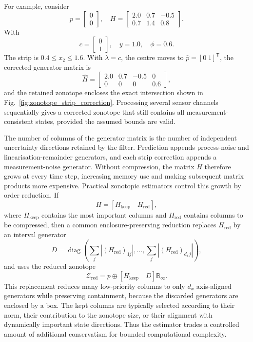 \documentclass{ieeeaccess}
\begin{document}
For example, consider
\begin{equation}
p=
\begin{bmatrix}
0\\
0
\end{bmatrix},
\quad
H=
\begin{bmatrix}
2.0 & 0.7 & -0.5\\
0.7 & 1.4 & 0.8
\end{bmatrix}.
\end{equation}
With
\begin{equation}
c=
\begin{bmatrix}
0\\
1
\end{bmatrix},
\quad
y=1.0,\quad
\phi=0.6.
\end{equation}
The strip is $0.4\le x_2\le1.6$. With $\lambda=c$, the centre moves to $\hat p=[0\;1]^{\mathsf T}$, the corrected generator matrix is
\begin{equation}
\hat H=
\begin{bmatrix}
2.0 & 0.7 & -0.5 & 0\\
0 & 0 & 0 & 0.6
\end{bmatrix},
\end{equation}
and the retained zonotope encloses the exact intersection shown in Fig.~\ref{fig:zonotope_strip_correction}. Processing several sensor channels sequentially gives a corrected zonotope that still contains all measurement-consistent states, provided the assumed bounds are valid.

The number of columns of the generator matrix is the number of independent uncertainty directions retained by the filter. Prediction appends process-noise and linearisation-remainder generators, and each strip correction appends a measurement-noise generator. Without compression, the matrix $H$ therefore grows at every time step, increasing memory use and making subsequent matrix products more expensive. Practical zonotopic estimators control this growth by order reduction. If
\begin{equation}
H=\left[H_{\mathrm{keep}}\quad H_{\mathrm{red}}\right],
\end{equation}
where $H_{\mathrm{keep}}$ contains the most important columns and $H_{\mathrm{red}}$ contains columns to be compressed, then a common enclosure-preserving reduction replaces $H_{\mathrm{red}}$ by an interval generator
\begin{equation}
D=\operatorname{diag}\!\left(\sum_j |(H_{\mathrm{red}})_{1j}|,\ldots,
\sum_j |(H_{\mathrm{red}})_{d_xj}|\right),
\end{equation}
and uses the reduced zonotope
\begin{equation}
\mathcal{Z}_{\mathrm{red}}
=
p\oplus
\left[H_{\mathrm{keep}}\quad D\right]\mathbb{B}_{\infty}.
\end{equation}
This replacement reduces many low-priority columns to only $d_x$ axis-aligned generators while preserving containment, because the discarded generators are enclosed by a box. The kept columns are typically selected according to their norm, their contribution to the zonotope size, or their alignment with dynamically important state directions. Thus the estimator trades a controlled amount of additional conservatism for bounded computational complexity.
\end{document}
